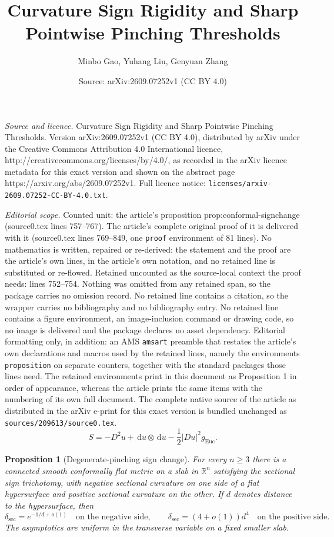 \documentclass[10pt,a4paper]{amsart}
\title{Curvature Sign Rigidity and Sharp Pointwise Pinching Thresholds}
\author{Minbo Gao, Yuhang Liu, Genyuan Zhang}
\date{Source: arXiv:2609.07252v1 (CC BY 4.0)}
\newtheorem{proposition}{Proposition}
\newcommand{\R}{\mathbb R}
\newcommand{\abs}[1]{\lvert #1\rvert}
\newcommand{\dd}{\,\mathrm d}
\newcommand{\dsec}{\delta_{\mathrm{sec}}}
\begin{document}
\maketitle

\noindent\emph{Source and licence.} Curvature Sign Rigidity and Sharp Pointwise Pinching Thresholds. Version arXiv:2609.07252v1 (CC BY 4.0), distributed by arXiv under the Creative Commons Attribution 4.0 International licence, http://creativecommons.org/licenses/by/4.0/, as recorded in the arXiv licence metadata for this exact version and shown on the abstract page https://arxiv.org/abs/2609.07252v1. Full licence notice: \texttt{licenses/arxiv-2609.07252-CC-BY-4.0.txt}.\par\smallskip

\noindent\textit{Editorial scope.} Counted unit: the article's proposition prop:conformal-signchange (source0.tex lines 757--767). The article's complete original proof of it is delivered with it (source0.tex lines 769--849, one \texttt{proof} environment of 81 lines). No mathematics is written, repaired or re-derived: the statement and the proof are the article's own lines, in the article's own notation, and no retained line is substituted or re-flowed.  Retained uncounted as the source-local context the proof needs: lines 752--754.  Nothing was omitted from any retained span, so the package carries no omission record.  No retained line contains a citation, so the wrapper carries no bibliography and no bibliography entry.  No retained line contains a figure environment, an image-inclusion command or drawing code, so no image is delivered and the package declares no asset dependency.  Editorial formatting only, in addition: an AMS \texttt{amsart} preamble that restates the article's own declarations and macros used by the retained lines, namely the environments \texttt{proposition} on separate counters, together with the standard packages those lines need.  The retained environments print in this document as Proposition 1 in order of appearance, whereas the article prints the same items with the numbering of its own full document.  The complete native source of the article as distributed in the arXiv e-print for this exact version is bundled unchanged as \texttt{sources/209613/source0.tex}.
\begin{equation}\label{eq:Schouten-conf}
S=-D^2u+\dd u\otimes\dd u-\frac12\abs{Du}^2g_{\mathrm{Euc}}.
\end{equation}

\begin{proposition}[Degenerate-pinching sign change]\label{prop:conformal-signchange}
For every $n\ge3$ there is a connected smooth conformally flat metric on a slab in $\R^n$ satisfying the sectional sign trichotomy, with negative sectional curvature on one side of a flat hypersurface and positive sectional curvature on the other.  If $d$ denotes distance to the hypersurface, then
\begin{equation}\label{eq:degenerate-rates}
\dsec=e^{-1/d+o(1)}
\quad\text{on the negative side},
\qquad
\dsec=(4+o(1))d^4
\quad\text{on the positive side}.
\end{equation}
The asymptotics are uniform in the transverse variable on a fixed smaller slab.
\end{proposition}
\end{document}
